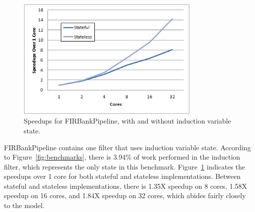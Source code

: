 \begin{figure}[t]
\includegraphics[width=3.5in]{figures/firbank-results.png}
\caption{Speedups for FIRBankPipeline, with and without induction variable state.  \protect\label{fig:firbank-results}}
\end{figure}

FIRBankPipeline contains one filter that uses induction variable state.  According to Figure~\ref{fig:benchmarks}, there is 3.94\% of work performed in the induction filter, which represents the only state in this benchmark.  Figure~\ref{fig:firbank-results} indicates the speedups over 1 core for both stateful and stateless implementations.  Between stateful and stateless implementations, there is 1.35X speedup on 8 cores, 1.58X speedup on 16 cores, and 1.84X speedup on 32 cores, which abides fairly closely to the model.